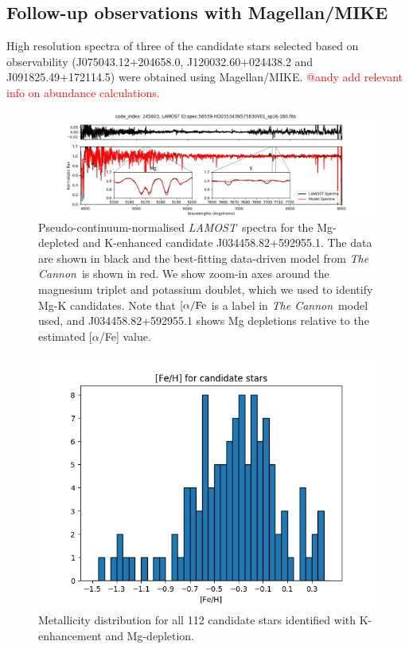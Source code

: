 \documentclass[a4paper,fleqn,usenatbib]{mnras}
\newcommand{\todo}[1]{\textcolor{red}{#1}}
\newcommand{\project}[1]{\emph{#1}}
\newcommand{\lamost}{\project{LAMOST}}
\newcommand{\tc}{\project{The Cannon}}
\begin{document}


\subsection{Follow-up observations with Magellan/MIKE}
High resolution spectra of three of the candidate stars selected based on observability (J075043.12+204658.0, J120032.60+024438.2 and J091825.49+172114.5) were obtained using Magellan/MIKE. \todo{@andy add relevant info on abundance calculations.}


\begin{figure}
	\includegraphics[width=\textwidth]{posterchildof13.png}
    \caption{Pseudo-continuum-normalised \lamost\ spectra for the Mg-depleted and K-enhanced candidate J034458.82+592955.1. The data  are shown in black and the best-fitting data-driven model from \tc\ is shown in red. We show zoom-in axes around the magnesium triplet and potassium doublet, which we used to identify Mg-K candidates. Note that $[\alpha/{\rm Fe}$ is a label in \tc\ model used, and J034458.82+592955.1 shows Mg depletions relative to the estimated [$\alpha$/Fe] value.}
    \label{posterchild}
\end{figure}

\begin{figure}
	\includegraphics[width=\columnwidth]{histof113.png}
    \caption{Metallicity distribution for all 112 candidate stars identified with K-enhancement and Mg-depletion.}
    \label{mhist}
\end{figure}
\end{document}
